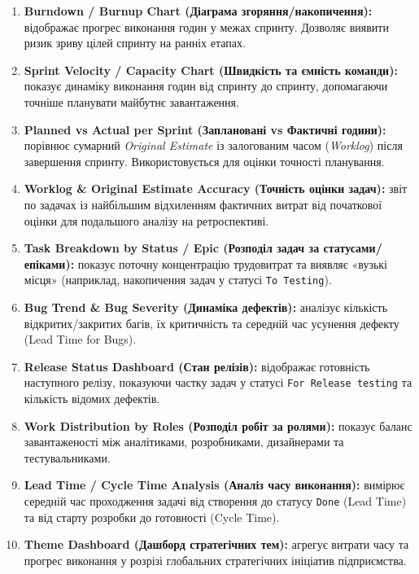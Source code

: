 \documentclass{article}
\begin{document}
\begin{enumerate}
    \item \textbf{Burndown / Burnup Chart (Діаграма згоряння/накопичення):} відображає прогрес виконання годин у межах спринту. Дозволяє виявити ризик зриву цілей спринту на ранніх етапах.
    \item \textbf{Sprint Velocity / Capacity Chart (Швидкість та ємність команди):} показує динаміку виконання годин від спринту до спринту, допомагаючи точніше планувати майбутнє завантаження.
    \item \textbf{Planned vs Actual per Sprint (Заплановані vs Фактичні години):} порівнює сумарний \emph{Original Estimate} із залогованим часом (\emph{Worklog}) після завершення спринту. Використовується для оцінки точності планування.
    \item \textbf{Worklog \& Original Estimate Accuracy (Точність оцінки задач):} звіт по задачах із найбільшим відхиленням фактичних витрат від початкової оцінки для подальшого аналізу на ретроспективі.
    \item \textbf{Task Breakdown by Status / Epic (Розподіл задач за статусами/епіками):} показує поточну концентрацію трудовитрат та виявляє «вузькі місця» (наприклад, накопичення задач у статусі \texttt{To Testing}).
    \item \textbf{Bug Trend \& Bug Severity (Динаміка дефектів):} аналізує кількість відкритих/закритих багів, їх критичність та середній час усунення дефекту (Lead Time for Bugs).
    \item \textbf{Release Status Dashboard (Стан релізів):} відображає готовність наступного релізу, показуючи частку задач у статусі \texttt{For Release testing} та кількість відомих дефектів.
    \item \textbf{Work Distribution by Roles (Розподіл робіт за ролями):} показує баланс завантаженості між аналітиками, розробниками, дизайнерами та тестувальниками.
    \item \textbf{Lead Time / Cycle Time Analysis (Аналіз часу виконання):} вимірює середній час проходження задачі від створення до статусу \texttt{Done} (Lead Time) та від старту розробки до готовності (Cycle Time).
    \item \textbf{Theme Dashboard (Дашборд стратегічних тем):} агрегує витрати часу та прогрес виконання у розрізі глобальних стратегічних ініціатив підприємства.
\end{enumerate}

\newpage
\end{document}
